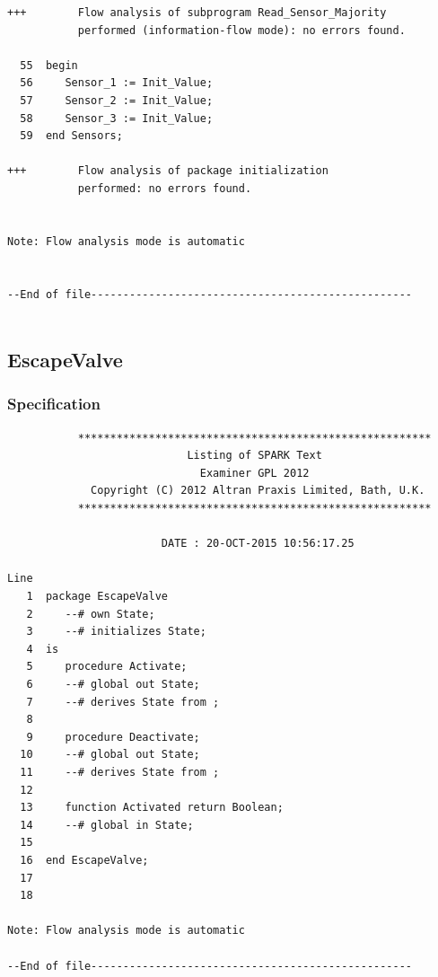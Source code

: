 \documentclass[a4paper, titlepage]{article}
\begin{document}
{\begin{lstlisting}
+++        Flow analysis of subprogram Read_Sensor_Majority 
           performed (information-flow mode): no errors found.

  55  begin
  56     Sensor_1 := Init_Value;
  57     Sensor_2 := Init_Value;
  58     Sensor_3 := Init_Value;   
  59  end Sensors;

+++        Flow analysis of package initialization 
           performed: no errors found.


Note: Flow analysis mode is automatic


--End of file--------------------------------------------------


\end{lstlisting}
}
\subsection{EscapeValve}
\subsubsection{Specification}
{\tiny
\begin{lstlisting}
           *******************************************************
                            Listing of SPARK Text
                              Examiner GPL 2012
             Copyright (C) 2012 Altran Praxis Limited, Bath, U.K.
           *******************************************************

                        DATE : 20-OCT-2015 10:56:17.25

Line
   1  package EscapeValve
   2     --# own State;
   3     --# initializes State;
   4  is
   5     procedure Activate;
   6     --# global out State;
   7     --# derives State from ;
   8  
   9     procedure Deactivate;
  10     --# global out State;
  11     --# derives State from ;
  12  
  13     function Activated return Boolean;
  14     --# global in State;
  15  
  16  end EscapeValve;
  17  
  18  

Note: Flow analysis mode is automatic

--End of file--------------------------------------------------
\end{lstlisting}
}
\end{document}
